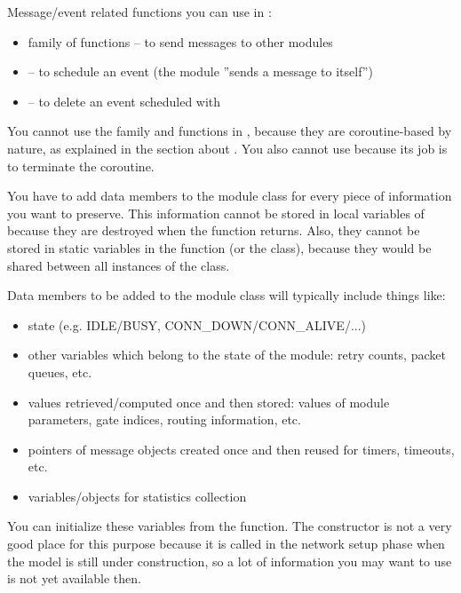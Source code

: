 Message/event related functions you can use in :
\begin{itemize}
\item{ family of functions -- to send messages to other modules}
\item{ -- to schedule an event (the module ''sends
a message to itself'')}
\item{ -- to delete an event scheduled with }
\end{itemize}

You cannot use the  family and
 functions in , because they are
coroutine-based by nature, as explained in the section about
. You also cannot use  because its job
is to terminate the coroutine.


You have to add data members to the module class for every piece
of information you want to preserve. This information cannot
be stored in local variables of  because they
are destroyed when the function returns. Also, they cannot be
stored in static variables in the function (or the class), because
they would be shared between all instances of the class.


Data members to be added to the module class will typically include
things like:
\begin{itemize}
\item{state (e.g. IDLE/BUSY, CONN\_DOWN/CONN\_ALIVE/...)}
\item{other variables which belong to the state of the module: retry
    counts, packet queues, etc.}
\item{values retrieved/computed once and then stored: values of module
    parameters, gate indices, routing information, etc.}
\item{pointers of message objects created once and then reused for
    timers, timeouts, etc.}
\item{variables/objects for statistics collection}
\end{itemize}

You can initialize these variables from the 
function.  The constructor is not a very good place
for this purpose because it is called in the network setup phase when
the model is still under construction, so a lot of information you may
want to use is not yet available then.


